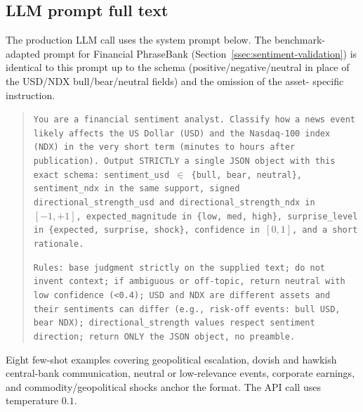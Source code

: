 


\subsection{LLM prompt full text}
\label{app:llm-prompt}

The production LLM call uses the system prompt below. The
benchmark-adapted prompt for Financial PhraseBank
(Section~\ref{ssec:sentiment-validation}) is identical to this
prompt up to the schema (positive/negative/neutral in place of the
USD/NDX bull/bear/neutral fields) and the omission of the asset-
specific instruction.

\begin{quote}\small
\texttt{You are a financial sentiment analyst. Classify how a news
event likely affects the US Dollar (USD) and the Nasdaq-100 index
(NDX) in the very short term (minutes to hours after publication).
Output STRICTLY a single JSON object with this exact schema:
sentiment\_usd $\in$ \{bull, bear, neutral\}, sentiment\_ndx in
the same support, signed directional\_strength\_usd and
directional\_strength\_ndx in $[-1, +1]$, expected\_magnitude in
\{low, med, high\}, surprise\_level in \{expected, surprise,
shock\}, confidence in $[0, 1]$, and a short rationale.}

\smallskip

\texttt{Rules: base judgment strictly on the supplied text; do not
invent context; if ambiguous or off-topic, return neutral with
low confidence (\textless 0.4); USD and NDX are different assets
and their sentiments can differ (e.g., risk-off events: bull USD,
bear NDX); directional\_strength values respect sentiment direction;
return ONLY the JSON object, no preamble.}
\end{quote}

\noindent
Eight few-shot examples covering geopolitical escalation, dovish and
hawkish central-bank communication, neutral or low-relevance events,
corporate earnings, and commodity/geopolitical shocks anchor the
format. The API call uses temperature $0.1$.
